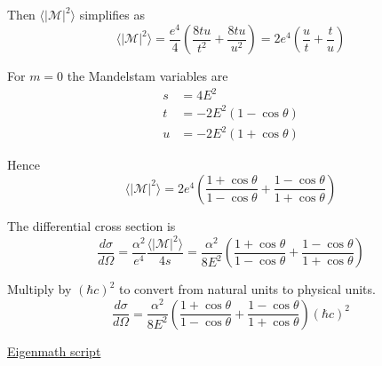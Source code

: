 Then $\langle|\mathcal{M}|^2\rangle$ simplifies as
\begin{equation*}
\langle|\mathcal{M}|^2\rangle
=\frac{e^4}{4}\left(\frac{8tu}{t^2}+\frac{8tu}{u^2}\right)
=2e^4\left(\frac{u}{t}+\frac{t}{u}\right)
\end{equation*}

For $m=0$ the Mandelstam variables are
\begin{align*}
s&=4E^2
\\
t&=-2E^2(1-\cos\theta)
\\
u&=-2E^2(1+\cos\theta)
\end{align*}

Hence
\begin{equation*}
\langle|\mathcal{M}|^2\rangle
=2e^4\left(\frac{1+\cos\theta}{1-\cos\theta}+\frac{1-\cos\theta}{1+\cos\theta}\right)
\end{equation*}

The differential cross section is
\begin{equation*}
\frac{d\sigma}{d\Omega}
=\frac{\alpha^2}{e^4}\frac{\langle|\mathcal{M}|^2\rangle}{4s}
=\frac{\alpha^2}{8E^2}
\left(\frac{1+\cos\theta}{1-\cos\theta}+\frac{1-\cos\theta}{1+\cos\theta}\right)
\end{equation*}

Multiply by $(\hbar c)^2$ to convert from natural units to physical units.
\begin{equation*}
\frac{d\sigma}{d\Omega}
=\frac{\alpha^2}{8E^2}
\left(\frac{1+\cos\theta}{1-\cos\theta}+\frac{1-\cos\theta}{1+\cos\theta}\right)
(\hbar c)^2
\end{equation*}

\href{https://georgeweigt.github.io/examples/annihilation-1-demo.html}{Eigenmath script}


